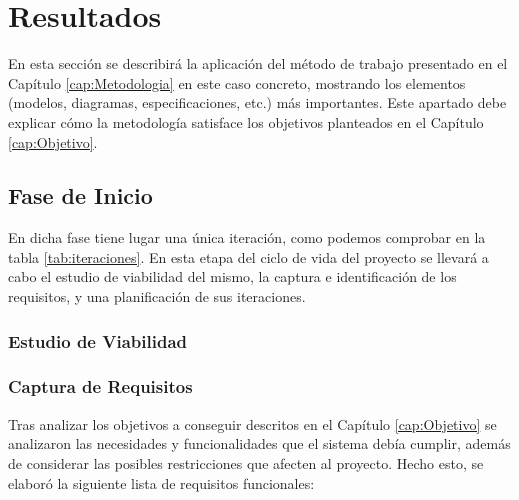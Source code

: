 \chapter{Resultados}
\label{cap:Resultados}

En esta sección se describirá la aplicación del método de trabajo presentado en el Capítulo \ref{cap:Metodologia} en este caso concreto, mostrando los elementos (modelos, diagramas, especificaciones, etc.) más importantes. Este apartado debe explicar cómo la metodología satisface los objetivos planteados en el Capítulo \ref{cap:Objetivo}.

\section{Fase de Inicio}
\label{sec:Resultados.Inicio}

En dicha fase tiene lugar una única iteración, como podemos comprobar en la tabla \ref{tab:iteraciones}. En esta etapa del ciclo de vida del proyecto se llevará a cabo el estudio de viabilidad del mismo, la captura e identificación de los requisitos, y una planificación de sus iteraciones.

\subsection{Estudio de Viabilidad}
\label{subsec:Resultados.Inicio.Viabilidad}

\subsection{Captura de Requisitos}
\label{subsec:Resultados.Inicio.Requisitos}

Tras analizar los objetivos a conseguir descritos en el Capítulo \ref{cap:Objetivo} se analizaron las necesidades y funcionalidades que el sistema debía cumplir, además de considerar las posibles restricciones que afecten al proyecto. Hecho esto, se elaboró la siguiente lista de requisitos funcionales:

